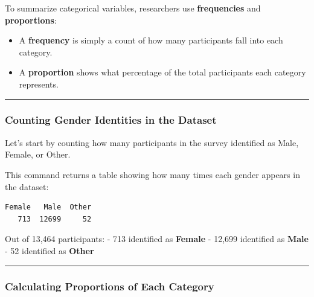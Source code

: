 \documentclass[
]{book}
\newenvironment{Shaded}{\begin{snugshade}}{\end{snugshade}}
\newcommand{\CommentTok}[1]{\textcolor[rgb]{0.56,0.35,0.01}{\textit{#1}}}
\newcommand{\FunctionTok}[1]{\textcolor[rgb]{0.13,0.29,0.53}{\textbf{#1}}}
\newcommand{\NormalTok}[1]{#1}
\newcommand{\SpecialCharTok}[1]{\textcolor[rgb]{0.81,0.36,0.00}{\textbf{#1}}}
\providecommand{\tightlist}{%
  \setlength{\itemsep}{0pt}\setlength{\parskip}{0pt}}
\begin{document}
To summarize categorical variables, researchers use \textbf{frequencies} and \textbf{proportions}:

\begin{itemize}
\tightlist
\item
  A \textbf{frequency} is simply a count of how many participants fall into each category.
\item
  A \textbf{proportion} shows what percentage of the total participants each category represents.
\end{itemize}

\begin{center}\rule{0.5\linewidth}{0.5pt}\end{center}

\subsubsection*{Counting Gender Identities in the Dataset}\label{counting-gender-identities-in-the-dataset}

Let's start by counting how many participants in the survey identified as Male, Female, or Other.

\begin{Shaded}
\end{Shaded}

This command returns a table showing how many times each gender appears in the dataset:

\begin{verbatim}
Female   Male  Other 
   713  12699     52 
\end{verbatim}

Out of 13,464 participants: - 713 identified as \textbf{Female} - 12,699 identified as \textbf{Male} - 52 identified as \textbf{Other}

\begin{center}\rule{0.5\linewidth}{0.5pt}\end{center}

\subsubsection*{Calculating Proportions of Each Category}\label{calculating-proportions-of-each-category}
\end{document}
